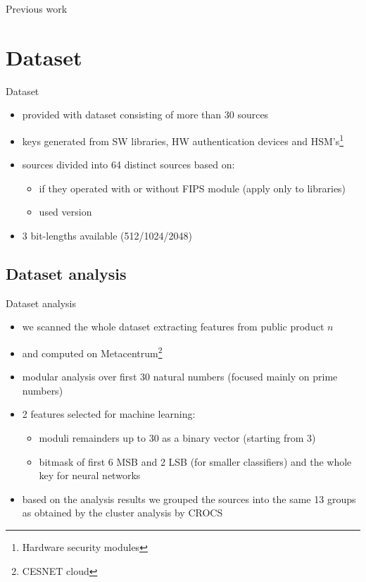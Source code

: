 \documentclass{beamer}
\newcommand\Fontsmall{\fontsize{8}{7.2}\selectfont}
\let\oldfootnote\footnote
\renewcommand\footnote[1][]{\oldfootnote[frame,#1]}
\begin{document}
\begin{darkframes}
\begin{frame}{Previous work}
    \end{frame}

    \section{Dataset}

    \begin{frame}{Dataset}
    
    \begin{itemize}
      \item provided with dataset consisting of more than 30 sources
      \item keys generated from SW libraries, HW authentication devices and HSM's\footnote{Hardware security modules}
      \item sources divided into 64 distinct sources based on:
      \begin{itemize}
        \item if they operated with or without FIPS module (apply only to libraries)
        \item used version
      \end{itemize}
      \item 3 bit-lengths available (512/1024/2048)
    \end{itemize} 
      
    \end{frame}

    \subsection{Dataset analysis}
    \begin{frame}{Dataset analysis}
      \Fontsmall   
      \begin{itemize}
        \item we scanned the whole dataset extracting features from public product $n$
        \item {} and {} computed on Metacentrum\footnote{CESNET cloud}
        \item modular analysis over first 30 natural numbers (focused mainly on prime numbers)
        \item 2 features selected for machine learning:
        
        \begin{itemize}
          \Fontsmall 
          \item moduli remainders up to 30 as a binary vector (starting from 3)
          \item bitmask of first 6 MSB and 2 LSB (for smaller classifiers) and the whole key for neural networks
        \end{itemize}
        \item based on the analysis results we grouped the sources into the same 13 groups as obtained by the cluster analysis by CROCS
      \end{itemize}  
      

\end{frame}
\end{darkframes}
\end{document}
